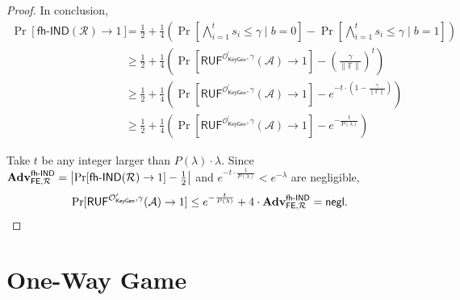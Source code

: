 \begin{proof}
In conclusion,
\begin{align*}
	\Pr[\textsf{fh-IND}(\mathcal{R}) \to 1] 
	&= \frac{1}{2} + \frac{1}{4} \left( \Pr \left[ \bigwedge_{i=1}^t s_i \leq \gamma \mid b = 0 \right] - \Pr \left[ \bigwedge_{i=1}^t s_i \leq \gamma \mid b = 1 \right] \right) \\
	&\geq \frac{1}{2} + \frac{1}{4} \left( \Pr[ \textsf{RUF}^{\mathcal{O}^\prime_{\textsf{KeyGen}}, \gamma}(\mathcal{A}) \to 1] - \left( \frac{\gamma}{\| \mathbb{F} \|} \right)^t \right) \\
	&\geq \frac{1}{2} + \frac{1}{4} \left( \Pr[ \textsf{RUF}^{\mathcal{O}^\prime_{\textsf{KeyGen}}, \gamma}(\mathcal{A}) \to 1] -  e^{- t \cdot (1 - \frac{\gamma}{\| \mathbb{F} \|}) } \right) \\
	&\geq \frac{1}{2} + \frac{1}{4} \left( \Pr[ \textsf{RUF}^{\mathcal{O}^\prime_{\textsf{KeyGen}}, \gamma}(\mathcal{A}) \to 1] -  e^{- \frac{t}{P(\lambda)} } \right)
\end{align*}

\noindent Take $t$ be any integer larger than $P(\lambda) \cdot \lambda$. Since $\mathbf{Adv}_{\textsf{FE}, \mathcal{R}}^\textsf{fh-IND} = \left| \Pr[\textsf{fh-IND}(\mathcal{R}) \to 1] - \frac{1}{2} \right|$ and $e^{-t \cdot \frac{1}{P(\lambda)}} < e^{-\lambda}$ are negligible,
\[
	\Pr[ \textsf{RUF}^{\mathcal{O}^\prime_{\textsf{KeyGen}}, \gamma}(\mathcal{A}) \to 1]  \leq e^{- \frac{t}{P(\lambda)} } + 4 \cdot \mathbf{Adv}_{\textsf{FE}, \mathcal{R}}^\textsf{fh-IND}  = \mathsf{negl}.
\]

\end{proof}


\newpage



\section{One-Way Game}

